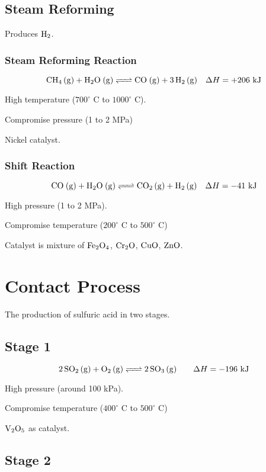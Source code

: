 \documentclass[a4paper,11pt]{article}
\begin{document}
\subsection{Steam Reforming}

Produces $\ce{H2}$.


\subsubsection{Steam Reforming Reaction}

$$
\ce{CH4 (g) + H2O (g) <=> CO (g) + 3H2 (g)} \quad \Delta H = +206\mbox{ kJ}
$$

High temperature ($700^\circ\text{ C}$ to $1000^\circ\text{ C}$).

Compromise pressure (1 to 2 MPa)

Nickel catalyst.


\subsubsection{Shift Reaction}

$$
\ce{CO (g) + H2O (g) <=> CO2 (g) + H2 (g)} \quad \Delta H = -41\mbox{ kJ}
$$

High pressure (1 to 2 MPa).

Compromise temperature ($200^\circ\text{ C}$ to $500^\circ\text{ C}$)

Catalyst is mixture of $\ce{Fe2O4}$, $\ce{Cr2O}$, $\ce{CuO}$, $\ce{ZnO}$.




\section{Contact Process}

The production of sulfuric acid in two stages.

\subsection{Stage 1}

$$
\ce{2SO2 (g) + O2 (g) <=> 2SO3 (g)} \qquad \Delta H = -196\mbox{ kJ}
$$

High pressure (around 100 kPa).

Compromise temperature ($400^\circ\text{ C}$ to $500^\circ\text{ C}$)

$\ce{V2O5}$ as catalyst.


\subsection{Stage 2}
\end{document}

